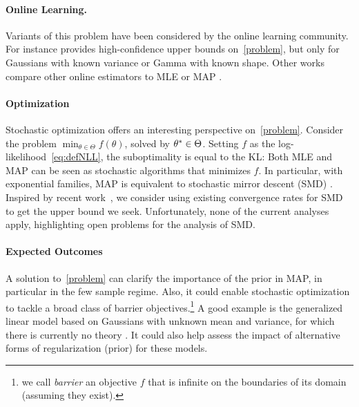 \paragraph{Online Learning.}
Variants of this problem have been considered by the online learning community. For instance \citet[Th.~9-10]{kaufmann2021mixture} provides high-confidence upper bounds on~\eqref{problem}, but only for Gaussians with known variance or Gamma with known shape.
Other works compare other online estimators to MLE or MAP \citep{azoury2001relative,dasgupta2007online}.


\paragraph{Optimization} 
Stochastic optimization offers an interesting perspective on~\eqref{problem}.
Consider the problem $\min_{\theta\in \Theta} f(\theta)$, solved by $\theta^*\in \Theta$.
Setting $f$ as the log-likelihood~\eqref{eq:defNLL}, the suboptimality is equal to the KL:
Both MLE and MAP can be seen as stochastic algorithms that minimizes $f$.
In particular, with exponential families, MAP is equivalent to stochastic mirror descent (SMD) \citep{nemirovski2009robust}.
Inspired by recent work~\citep{lepriol2021analysis, kunstner2020homeomorphic}, we consider using existing convergence rates for SMD to get the upper bound we seek.
Unfortunately, none of the current analyses apply, highlighting open problems for the analysis of SMD.

\paragraph{Expected Outcomes}
A solution to~\eqref{problem} can clarify the importance of the prior in MAP, in particular in the few sample regime. %
Also, it could enable stochastic optimization to tackle a broad class of barrier objectives.\footnote{we call \emph{barrier} an objective $f$ that is infinite on the boundaries of its domain (assuming they exist).}
A good example is the generalized linear model based on Gaussians with unknown mean and variance, for which there is currently no theory \citep{bach2013nonstronglyconvex}.
It could also help assess the impact of alternative forms of regularization (prior) for these models.

